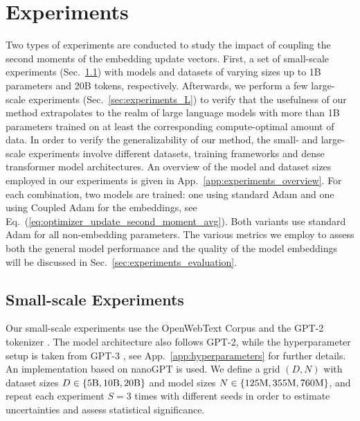 \section{Experiments}
\label{sec:experiments}

Two types of experiments are conducted to study the impact of coupling the second moments of the embedding update vectors. 
First, a set of small-scale experiments (Sec.~\ref{sec:experiments_S}) with models and datasets of varying sizes up to 1B parameters and 20B tokens, respectively.
Afterwards, we perform a few large-scale experiments (Sec.~\ref{sec:experiments_L}) to verify that the usefulness of our method extrapolates to the realm of large language models with more than 1B parameters trained on at least the corresponding compute-optimal \cite{hoffmann2022trainingcomputeoptimallargelanguage} amount of data.
In order to verify the generalizability of our method, the small- and large-scale experiments involve different datasets, training frameworks and dense transformer model architectures. 
An overview of the model and dataset sizes employed in our experiments is given in App.~\ref{app:experiments_overview}.
For each combination, two models are trained: one using standard Adam and one using Coupled Adam for the embeddings, see Eq.~(\ref{eq:optimizer_update_second_moment_avg}). Both variants use standard Adam for all non-embedding parameters. The various metrics we employ to assess both the general model performance and the quality of the model embeddings will be discussed in Sec.~\ref{sec:experiments_evaluation}.
\subsection{Small-scale Experiments}
\label{sec:experiments_S}
Our small-scale experiments use the OpenWebText Corpus \cite{Gokaslan2019OpenWeb} and the GPT-2 tokenizer \cite{radford2019language}. The model architecture also follows GPT-2, while the hyperparameter setup is taken from GPT-3 \cite{brown2020languagemodelsfewshotlearners}, see App.~\ref{app:hyperparameters} for further details. An implementation based on nanoGPT \cite{Karpathy2022} is used. 
We define a grid $(D, N)$ with dataset sizes 
$D \in \{ 5\rm B, 10\rm B, 20\rm B \}$
and model sizes 
$N \in \{ 125\rm M, 355\rm M, 760\rm M \}$,
and repeat each experiment $S = 3$ times with different seeds in order to estimate uncertainties and assess statistical significance.
